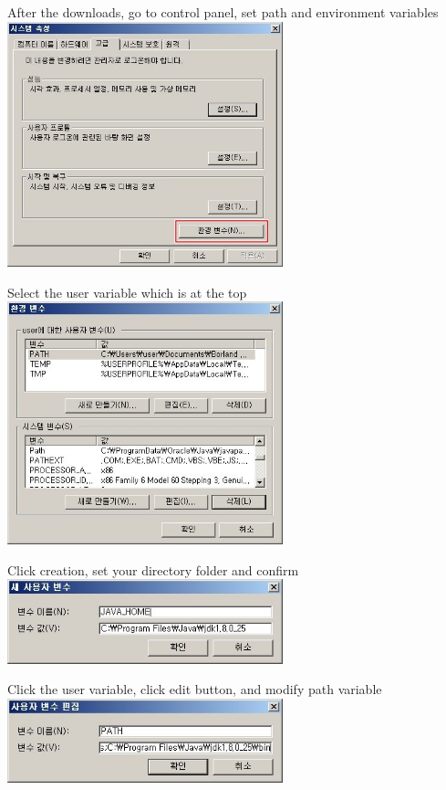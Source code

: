 \documentclass[12pt]{article}
\begin{document}
\begin{center}
After the downloads, go to control panel, set path and environment variables\\ [1\baselineskip]
\includegraphics[width=80mm,scale=1.3]{jdk4}
\end{center}
\newpage
\begin{center}
Select the user variable which is at the top\\ [1\baselineskip]
\includegraphics[width=80mm,scale=1.3]{jdk5}
\end{center}

\begin{center}
Click creation, set your directory folder and confirm\\ [1\baselineskip]
\includegraphics[width=80mm,scale=1.3]{jdk6}
\end{center}

\begin{center}
Click the user variable, click edit button, and modify path variable\\ [1\baselineskip]
\includegraphics[width=80mm,scale=1.3]{jdk7}
\end{center}
\end{document}
